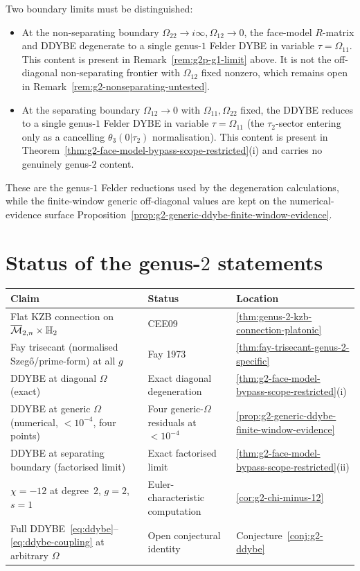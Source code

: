 \begin{remark}
\label{rem:engine-docstring-corrigenda}
Two boundary limits must be distinguished:
\begin{itemize}
\item At the non-separating
 boundary $\Omega_{22}\to i\infty,\Omega_{12}\to 0$,
 the face-model $R$-matrix and DDYBE degenerate to a
 single genus-$1$ Felder DYBE in variable
 $\tau=\Omega_{11}$. This content is present in
 Remark~\ref{rem:g2p-g1-limit} above. It is not the
 off-diagonal non-separating frontier with $\Omega_{12}$ fixed
 nonzero, which remains open in
 Remark~\ref{rem:g2-nonseparating-untested}.
\item At the separating boundary
 $\Omega_{12}\to 0$ with $\Omega_{11},\Omega_{22}$ fixed,
 the DDYBE reduces to a single genus-$1$ Felder DYBE in
 variable $\tau=\Omega_{11}$ (the $\tau_2$-sector entering
 only as a cancelling $\theta_3(0|\tau_2)$ normalisation).
 This content is present in
 Theorem~\ref{thm:g2-face-model-bypass-scope-restricted}(i)
 and carries no genuinely genus-$2$ content.
\end{itemize}
These are the genus-$1$ Felder reductions used by the degeneration
calculations, while the finite-window generic off-diagonal values are
kept on the numerical-evidence surface
Proposition~\ref{prop:g2-generic-ddybe-finite-window-evidence}.
\end{remark}

\section*{Status of the genus-$2$ statements}

\begin{center}
\renewcommand{\arraystretch}{1.15}
\begin{tabular}{@{}lll@{}}
\toprule
Claim & Status & Location \\
\midrule
Flat KZB connection on
 $\overline{\mathcal{M}}_{2,n}\times\mathbb{H}_2$
 & CEE09 &
 \cref{thm:genus-2-kzb-connection-platonic} \\
Fay trisecant (normalised Szeg\H{o}/prime-form) at all $g$
 & Fay 1973 &
 \cref{thm:fay-trisecant-genus-2-specific} \\
DDYBE at diagonal $\Omega$ (exact)
 & Exact diagonal degeneration &
 \cref{thm:g2-face-model-bypass-scope-restricted}(i) \\
DDYBE at generic $\Omega$ (numerical, $<10^{-4}$, four points)
 & Four generic-\(\Omega\) residuals at \(<10^{-4}\) &
 \cref{prop:g2-generic-ddybe-finite-window-evidence} \\
DDYBE at separating boundary (factorised limit)
 & Exact factorised limit &
 \cref{thm:g2-face-model-bypass-scope-restricted}(ii) \\
$\chi=-12$ at degree~$2$, $g=2$, $s=1$
 & Euler-characteristic computation &
 \cref{cor:g2-chi-minus-12} \\
Full DDYBE~\eqref{eq:ddybe}--\eqref{eq:ddybe-coupling}
 at arbitrary $\Omega$
 & Open conjectural identity &
 Conjecture~\ref{conj:g2-ddybe} \\
\bottomrule
\end{tabular}
\end{center}

